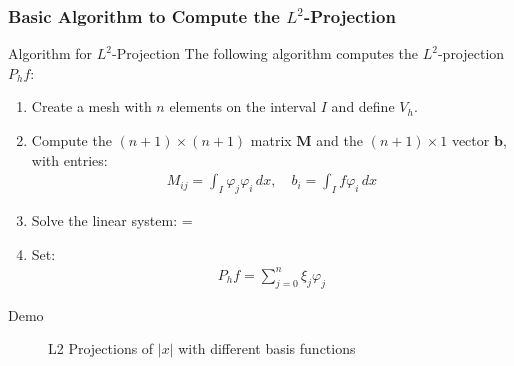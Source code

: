 \documentclass{beamer}
\begin{document}
\begin{frame}
  \frametitle{Basic Algorithm to Compute the $L^2$-Projection}
  
  \begin{block}{Algorithm for $L^2$-Projection}
    The following algorithm computes the $L^2$-projection $P_h f$:
    
    \begin{enumerate}
      \item Create a mesh with $n$ elements on the interval $I$ and define $V_h$.
      
      \item Compute the $(n+1) \times (n+1)$ matrix $\mathbf{M}$ and the $(n+1) \times 1$ vector $\mathbf{b}$, with entries:
      \begin{align}
        M_{ij} = \int_I \varphi_j \varphi_i \, dx, \quad b_i = \int_I f \varphi_i \, dx
      \end{align}
      
      \item Solve the linear system:
         \boldsymbol{\xi} = 
      
      \item Set:
      \begin{align}
        P_h f = \sum_{j=0}^n \xi_j \varphi_j
      \end{align}
    \end{enumerate}
  \end{block}
\end{frame}



\begin{frame}{Demo}
    \begin{figure}
        \centering
        \caption{L2 Projections of $|x|$ with different basis functions}
        \label{fig:l2-projections}
    \end{figure}
\end{frame}
\end{document}
